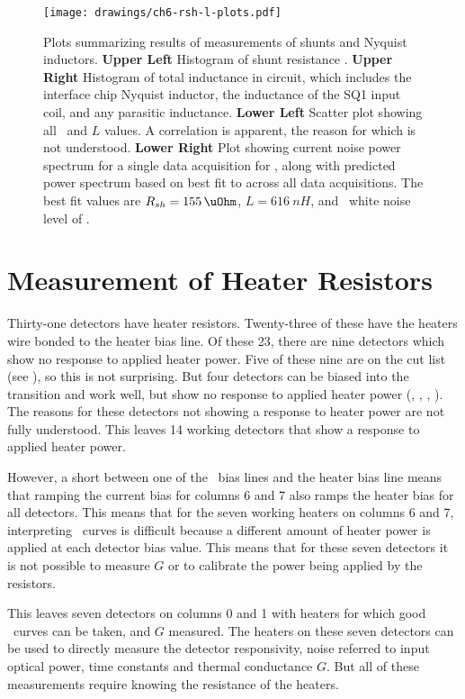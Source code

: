 \begin{figure*}
\texttt{[image: drawings/ch6-rsh-l-plots.pdf]}
\caption[Measurements of shunt resistors and Nyquist inductors]{
Plots summarizing results of measurements of shunts and Nyquist inductors.
\textbf{Upper Left} Histogram of shunt resistance \Rsh.
\textbf{Upper Right} Histogram of total inductance in circuit, which includes the interface chip Nyquist inductor, the inductance of the SQ1 input coil, and any parasitic inductance.
\textbf{Lower Left} Scatter plot showing all \Rsh\ and $L$ values. A correlation is apparent, the reason for which is not understood.
\textbf{Lower Right} Plot showing current noise power spectrum for a single data acquisition for , along with predicted power spectrum based on best fit to  across all data acquisitions. The best fit values are $\Rsh=\SI{155}{\uOhm}$, $L = \SI{616}{nH}$, and \SQUID\ white noise level of .}
\label{fig:rsh-l-plots}
\end{figure*}

\section{Measurement of Heater Resistors} \label{sec:heater-r}

Thirty-one detectors have heater resistors.
Twenty-three of these have the heaters wire bonded to the heater bias line.
Of these 23, there are nine detectors which show no response to applied heater power.
Five of these nine are on the cut list (see ), so this is not surprising.
But four detectors can be biased into the transition and work well, but show no response to applied heater power (, , , ).
The reasons for these detectors not showing a response to heater power are not fully understood.
This leaves 14 working detectors that show a response to applied heater power.

However, a short between one of the \TES\ bias lines and the heater bias line means that ramping the current bias for columns 6 and 7 also ramps the heater bias for all detectors.
This means that for the seven working heaters on columns 6 and 7, interpreting \IV\ curves is difficult because a different amount of heater power is applied at each detector bias value.
This means that for these seven detectors it is not possible to measure $G$ or to calibrate the power being applied by the resistors.

This leaves seven detectors on columns 0 and 1 with heaters for which good \IV\ curves can be taken, and $G$ measured.
The heaters on these seven detectors can be used to directly measure the detector responsivity, noise referred to input optical power, time constants and thermal conductance $G$.
But all of these measurements require knowing the resistance of the heaters.


